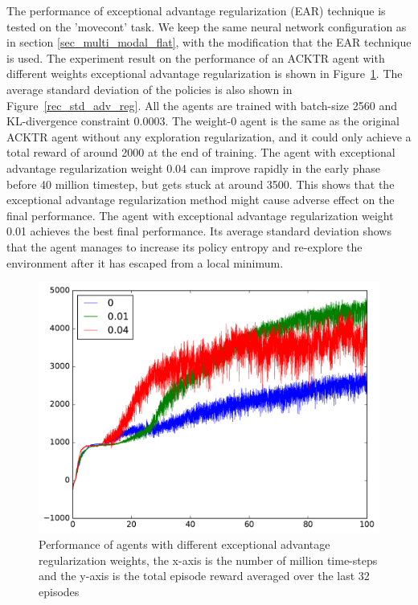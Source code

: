 The performance of exceptional advantage regularization (EAR) technique is tested on the 'movecont' task. We keep the same neural network configuration as in section \ref{sec_multi_modal_flat}, with the modification that the EAR technique is used.
The experiment result on the performance of an ACKTR agent with different weights exceptional advantage regularization is shown in Figure~\ref{rec_adv_reg}. The average standard deviation of the policies is also shown in Figure~\ref{rec_std_adv_reg}. All the agents are trained with batch-size 2560 and KL-divergence constraint 0.0003. The weight-0 agent is the same as the original ACKTR agent without any exploration regularization, and it could only achieve a total reward of around 2000 at the end of training. The agent with exceptional advantage regularization weight 0.04 can improve rapidly in the early phase before 40 million timestep, but gets stuck at around 3500. This shows that the exceptional advantage regularization method might cause adverse effect on the final performance. The agent with exceptional advantage regularization weight 0.01 achieves the best final performance. Its average standard deviation shows that the agent manages to increase its policy entropy and re-explore the environment after it has escaped from a local minimum.
\begin{figure}[!htbp]
	\includegraphics[width=\textwidth]{images/rec_adv_reg.pdf}
	\centering
	\caption{Performance of agents with different exceptional advantage regularization weights, the x-axis is the number of million time-steps and the y-axis is the total episode reward averaged over the last 32 episodes}\label{rec_adv_reg}
\end{figure}

